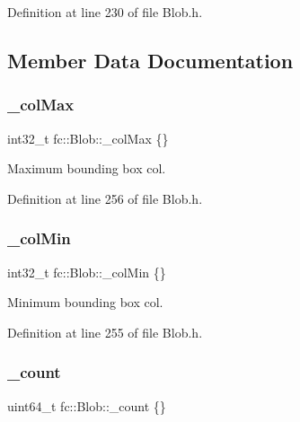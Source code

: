 Definition at line 230 of file Blob.\+h.



\subsection{Member Data Documentation}
\mbox{\label{classfc_1_1Blob_ab35bcad8687bcbd04b0a7952702a88a6}} 
\subsubsection{\texorpdfstring{\+\_\+col\+Max}{\_colMax}}
{\footnotesize\ttfamily int32\+\_\+t fc\+::\+Blob\+::\+\_\+col\+Max \{\}\hspace{0.3cm}{\ttfamily [private]}}



Maximum bounding box col. 



Definition at line 256 of file Blob.\+h.

\mbox{\label{classfc_1_1Blob_aa962a217328b361385584042e8d29eb9}} 
\subsubsection{\texorpdfstring{\+\_\+col\+Min}{\_colMin}}
{\footnotesize\ttfamily int32\+\_\+t fc\+::\+Blob\+::\+\_\+col\+Min \{\}\hspace{0.3cm}{\ttfamily [private]}}



Minimum bounding box col. 



Definition at line 255 of file Blob.\+h.

\mbox{\label{classfc_1_1Blob_a7a36fdbf8d1c967b0664613f1b7f3a98}} 
\subsubsection{\texorpdfstring{\+\_\+count}{\_count}}
{\footnotesize\ttfamily uint64\+\_\+t fc\+::\+Blob\+::\+\_\+count \{\}\hspace{0.3cm}{\ttfamily [private]}}




